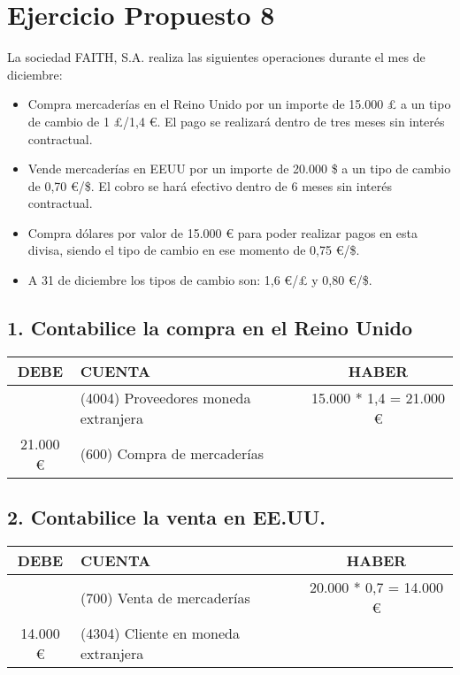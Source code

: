 \section*{Ejercicio Propuesto 8}

La sociedad FAITH, S.A. realiza las siguientes operaciones durante el mes de diciembre:

\begin{itemize}
    \item Compra mercaderías en el Reino Unido por un importe de 15.000 £ a un tipo de cambio de 1 £/1,4 €. El pago se realizará dentro de tres meses sin interés contractual.
    \item Vende mercaderías en EEUU por un importe de 20.000 \$ a un tipo de cambio de 0,70 €/\$. El cobro se hará efectivo dentro de 6 meses sin interés contractual.
    \item Compra dólares por valor de 15.000 € para poder realizar pagos en esta divisa, siendo el tipo de cambio en ese momento de 0,75 €/\$.
    \item A 31 de diciembre los tipos de cambio son: 1,6 €/£ y 0,80 €/\$.
\end{itemize}

\subsection*{1. Contabilice la compra en el Reino Unido}

\begin{table}[h!]
\centering
\begin{tabular}{|c|l|c|}
\hline
\textbf{DEBE} & \textbf{CUENTA} & \textbf{HABER} \\ \hline
              & (4004) Proveedores moneda extranjera & 15.000 * 1,4 = 21.000 € \\ \hline
21.000 €      & (600) Compra de mercaderías & \\ \hline
\end{tabular}
\end{table}

\subsection*{2. Contabilice la venta en EE.UU.}

\begin{table}[h!]
\centering
\begin{tabular}{|c|l|c|}
\hline
\textbf{DEBE} & \textbf{CUENTA} & \textbf{HABER} \\ \hline
              & (700) Venta de mercaderías & 20.000 * 0,7 = 14.000 € \\ \hline
14.000 €      & (4304) Cliente en moneda extranjera & \\ \hline
\end{tabular}
\end{table}


